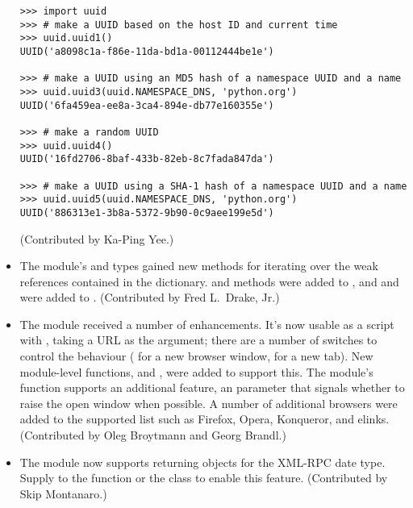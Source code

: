 \documentclass{howto}
\begin{document}
\begin{itemize}
\begin{verbatim}
>>> import uuid
>>> # make a UUID based on the host ID and current time
>>> uuid.uuid1()
UUID('a8098c1a-f86e-11da-bd1a-00112444be1e')

>>> # make a UUID using an MD5 hash of a namespace UUID and a name
>>> uuid.uuid3(uuid.NAMESPACE_DNS, 'python.org')
UUID('6fa459ea-ee8a-3ca4-894e-db77e160355e')

>>> # make a random UUID
>>> uuid.uuid4()
UUID('16fd2706-8baf-433b-82eb-8c7fada847da')

>>> # make a UUID using a SHA-1 hash of a namespace UUID and a name
>>> uuid.uuid5(uuid.NAMESPACE_DNS, 'python.org')
UUID('886313e1-3b8a-5372-9b90-0c9aee199e5d')
\end{verbatim}

(Contributed by Ka-Ping Yee.)

\item The  module's  and
 types gained new methods for iterating
over the weak references contained in the dictionary. 
 and  methods were
added to , and
 and  were added to
.  (Contributed by Fred L.~Drake, Jr.)

\item The  module received a number of
enhancements.
It's now usable as a script with , taking a
URL as the argument; there are a number of switches 
to control the behaviour ( for a new browser window, 
 for a new tab).  New module-level functions,
 and , were added 
to support this.  The module's  function supports an
additional feature, an  parameter that signals whether
to raise the open window when possible. A number of additional
browsers were added to the supported list such as Firefox, Opera,
Konqueror, and elinks.  (Contributed by Oleg Broytmann and Georg
Brandl.)

\item The  module now supports returning 
       objects for the XML-RPC date type.  Supply 
       to the  function
      or the  class to enable this feature.
      (Contributed by Skip Montanaro.)


\end{itemize}
\end{document}
